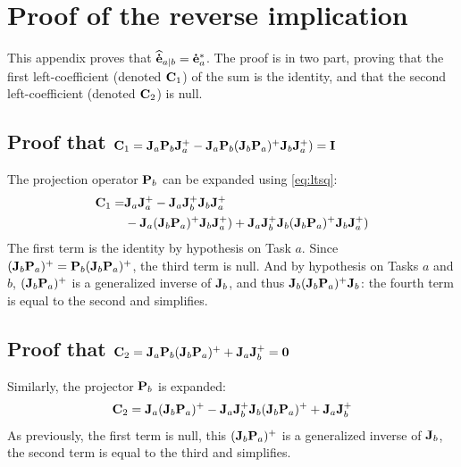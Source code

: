 \documentclass[letterpaper, 10pt, conference]{ieeeconf}      %
\begin{document}
\appendices
\section{Proof of the reverse implication}
\label{sec:appx}

This appendix proves that ${\mathbf{\widehat{\dot{e}}}}_{a|b} = {\mathbf{\dot{e}}}_{a}^*$. The proof is in two part, proving that the first left-coefficient (denoted ${\mathbf{C}}_1$) of the sum is the identity, and that the second left-coefficient (denoted ${\mathbf{C}}_2$) is null.

\subsection{Proof that ${\mathbf{C}}_1 = {\mathbf{J}}_{a} {\mathbf{P}}_{b} {\mathbf{J}}_{a}^+ - {\mathbf{J}}_{a} {\mathbf{P}}_{b} ({\mathbf{J}}_{b} {\mathbf{P}}_{a} )^+ {\mathbf{J}}_{b} {\mathbf{J}}_{a}^+) = {\mathbf{I}}$}
The projection operator ${\mathbf{P}}_{b}$ can be expanded using \eqref{eq:ltsq}:
\begin{align*}
{\mathbf{C}}_1 =& {\mathbf{J}}_{a} {\mathbf{J}}_{a}^+ -   {\mathbf{J}}_{a} {\mathbf{J}}_{b}^+ {\mathbf{J}}_{b} {\mathbf{J}}_{a}^+ \\
&- {\mathbf{J}}_{a} ({\mathbf{J}}_{b} {\mathbf{P}}_{a} )^+ {\mathbf{J}}_{b} {\mathbf{J}}_{a}^+)  + {\mathbf{J}}_{a} {\mathbf{J}}_{b}^+ {\mathbf{J}}_{b} ({\mathbf{J}}_{b} {\mathbf{P}}_{a} )^+ {\mathbf{J}}_{b} {\mathbf{J}}_{a}^+)
\end{align*}
The first term is the identity by hypothesis on Task $a$. Since $({\mathbf{J}}_{b} {\mathbf{P}}_{a} )^+ = {\mathbf{P}}_{b}({\mathbf{J}}_{b} {\mathbf{P}}_{a} )^+$, the third term is null. And by hypothesis on Tasks $a$ and $b$, $({\mathbf{J}}_{b} {\mathbf{P}}_{a} )^+$ is a generalized inverse of ${\mathbf{J}}_{b}$, and thus ${\mathbf{J}}_{b} ({\mathbf{J}}_{b} {\mathbf{P}}_{a} )^+ {\mathbf{J}}_{b}$: the fourth term is equal to the second and simplifies. \QED

\subsection{Proof that ${\mathbf{C}}_2 = {\mathbf{J}}_{a} {\mathbf{P}}_{b} ({\mathbf{J}}_{b} {\mathbf{P}}_{a} )^+ + {\mathbf{J}}_{a} {\mathbf{J}}_{b}^+ = {\mathbf{0}}$}
Similarly, the projector ${\mathbf{P}}_{b}$ is expanded:
\[
{\mathbf{C}}_2 = {\mathbf{J}}_{a} ({\mathbf{J}}_{b} {\mathbf{P}}_{a} )^+ - {\mathbf{J}}_{a} {\mathbf{J}}_{b}^+{\mathbf{J}}_{b} ({\mathbf{J}}_{b} {\mathbf{P}}_{a} )^+ + {\mathbf{J}}_{a} {\mathbf{J}}_{b}^+
\]
As previously, the first term is null, this $({\mathbf{J}}_{b} {\mathbf{P}}_{a} )^+$ is a generalized inverse of ${\mathbf{J}}_{b}$, the second term is equal to the third and simplifies. \QED



\end{document}
